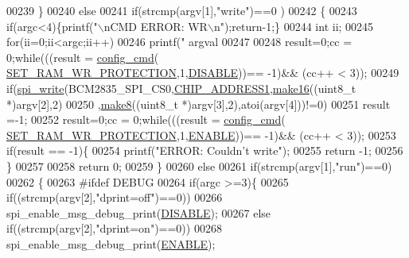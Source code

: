 \begin{DoxyCode}
{{{{00239      \}
00240      \textcolor{keywordflow}{else} 
00241      \textcolor{keywordflow}{if}(strcmp(argv[1],\textcolor{stringliteral}{"write"})==0 )
00242      \{
00243         \textcolor{keywordflow}{if}(argc<4)\{printf(\textcolor{stringliteral}{"\(\backslash\)nCMD ERROR: WR\(\backslash\)n"});\textcolor{keywordflow}{return}-1;\}
00244     \textcolor{keywordtype}{int} ii;
00245        \textcolor{keywordflow}{for}(ii=0;ii<argc;ii++)
00246             printf(\textcolor{stringliteral}{" argval %
00247         
00248         result=0;cc = 0;\textcolor{keywordflow}{while}(((result = \hyperlink{a00004_ga369ee0e8379941cbc2c79b90ec3292da}{config\_cmd}(
      \hyperlink{a00042_a5b534b9caab512045a6e762f3930a501}{SET\_RAM\_WR\_PROTECTION},1,\hyperlink{a00036_a99496f7308834e8b220f7894efa0b6ab}{DISABLE}))== -1)&& (cc++ < 3)); 
00249         \textcolor{keywordflow}{if}(\hyperlink{a00006_ga2770219ad8ad1eda1817c0df934b47d0}{spi\_write}(BCM2835\_SPI\_CS0,\hyperlink{a00036_a94de2b046db6e10257ef4481c0a15eaa}{CHIP\_ADDRESS1},\hyperlink{a00008_ga1e74920f34a07a82cca58eab71ed12b3}{make16}((uint8\_t *)argv[2],2)
00250         ,\hyperlink{a00008_gaefa26c3e5b22ccbe5de1c33305f20e1b}{make8}((uint8\_t *)argv[3],2),atoi(argv[4]))!=0)
00251           result =-1;
00252          result=0;cc = 0;\textcolor{keywordflow}{while}(((result = \hyperlink{a00004_ga369ee0e8379941cbc2c79b90ec3292da}{config\_cmd}(
      \hyperlink{a00042_a5b534b9caab512045a6e762f3930a501}{SET\_RAM\_WR\_PROTECTION},1,\hyperlink{a00036_a514ad415fb6125ba296793df7d1a468a}{ENABLE}))== -1)&& (cc++ < 3)); 
00253          \textcolor{keywordflow}{if}(result == -1)\{
00254                     printf(\textcolor{stringliteral}{"ERROR: Couldn't write"});  
00255                       \textcolor{keywordflow}{return} -1;
00256          \}
00257          
00258      \textcolor{keywordflow}{return} 0;
00259      \}
00260      \textcolor{keywordflow}{else}
00261      \textcolor{keywordflow}{if}(strcmp(argv[1],\textcolor{stringliteral}{"run"})==0) 
00262      \{
00263 \textcolor{preprocessor}{        #ifdef DEBUG}
00264 \textcolor{preprocessor}{}        \textcolor{keywordflow}{if}(argc >=3)\{
00265            \textcolor{keywordflow}{if}((strcmp(argv[2],\textcolor{stringliteral}{"dprint=off"})==0))
00266                spi\_enable\_msg\_debug\_print(\hyperlink{a00036_a99496f7308834e8b220f7894efa0b6ab}{DISABLE});
00267             \textcolor{keywordflow}{else} \textcolor{keywordflow}{if}((strcmp(argv[2],\textcolor{stringliteral}{"dprint=on"})==0))
00268                 spi\_enable\_msg\_debug\_print(\hyperlink{a00036_a514ad415fb6125ba296793df7d1a468a}{ENABLE});
}}}}}
\end{DoxyCode}
